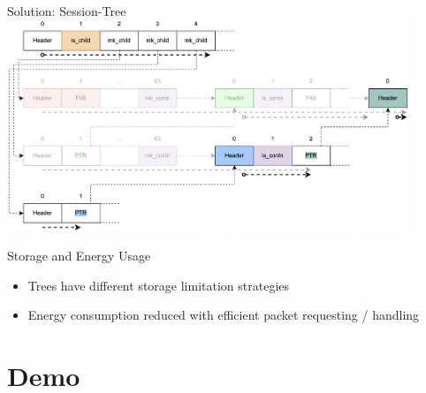 \documentclass[aspectratio=169]{beamer}
\begin{document}
\begin{frame}[c]{Solution: Session-Tree}
\includegraphics[width=0.9\textwidth]{images/session_6.png}      
\end{frame}

\begin{frame}[c]{Storage and Energy Usage}
\begin{itemize}
	\item Trees have different storage limitation strategies
	\item Energy consumption reduced with efficient packet requesting / handling
\end{itemize}
\end{frame}

\section{Demo}
\end{document}
